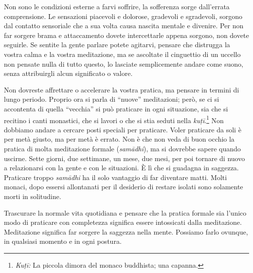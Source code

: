 Non sono le condizioni esterne a farvi soffrire, la sofferenza sorge
dall'errata comprensione. Le sensazioni piacevoli e dolorose, gradevoli
e sgradevoli, sorgono dal contatto sensoriale che a sua volta causa
nascita mentale e divenire. Per non far sorgere brama e attaccamento
dovete intercettarle appena sorgono, non dovete seguirle. Se sentite la
gente parlare potete agitarvi, pensare che distrugga la vostra calma e
la vostra meditazione, ma se ascoltate il cinguettio di un uccello non
pensate nulla di tutto questo, lo lasciate semplicemente andare come
suono, senza attribuirgli alcun significato o valore.

Non dovreste affrettare o accelerare la vostra pratica, ma pensare in
termini di lungo periodo. Proprio ora si parla di ``nuove'' meditazioni;
però, se ci si accontenta di quella ``vecchia'' si può praticare in ogni
situazione, sia che si recitino i canti monastici, che si lavori o che
si stia seduti nella \emph{kuṭī}.\footnote{\emph{Kuṭī:} La piccola
  dimora del monaco buddhista; una capanna.} Non dobbiamo andare a
cercare posti speciali per praticare. Voler praticare da soli è per metà
giusto, ma per metà è errato. Non è che non veda di buon occhio la
pratica di molta meditazione formale (\emph{samādhi}), ma si dovrebbe
sapere quando uscirne. Sette giorni, due settimane, un mese, due mesi,
per poi tornare di nuovo a relazionarsi con la gente e con le
situazioni. È lì che si guadagna in saggezza. Praticare troppo
\emph{samādhi} ha il solo vantaggio di far diventare matti. Molti
monaci, dopo essersi allontanati per il desiderio di restare isolati
sono solamente morti in solitudine.

Trascurare la normale vita quotidiana e pensare che la pratica formale
sia l'unico modo di praticare con completezza significa essere
intossicati dalla meditazione. Meditazione significa far sorgere la
saggezza nella mente. Possiamo farlo ovunque, in qualsiasi momento e in
ogni postura.

